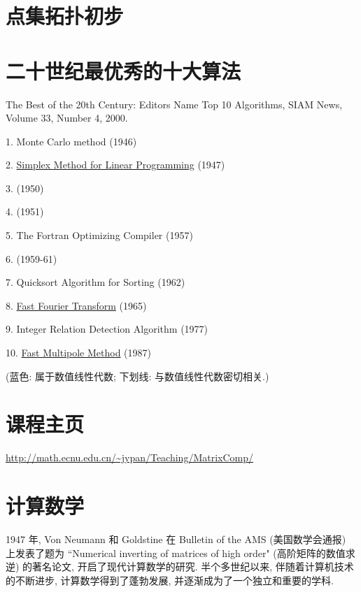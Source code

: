 \section{点集拓扑初步}


\section{二十世纪最优秀的十大算法}

\noindent
The Best of the 20th Century: Editors Name Top 10 Algorithms,
SIAM News, Volume 33, Number 4, 2000.

\begin{blist}\addtolength{\itemsep}{-0.5ex}
	\item[1.] Monte Carlo method (1946)
	\item[2.] \underline{Simplex Method for Linear Programming} (1947)
	\item[3.]  (1950)
	\item[4.]  (1951)
	\item[5.] The Fortran Optimizing Compiler (1957)
	\item[6.]  (1959-61)
	\item[7.] Quicksort Algorithm for Sorting (1962)
	\item[8.] \underline{Fast Fourier Transform} (1965)
	\item[9.] Integer Relation Detection Algorithm (1977)
	\item[10.] \underline{Fast Multipole Method} (1987)
\end{blist}
(蓝色: 属于数值线性代数; 下划线: 与数值线性代数密切相关.)

\section{课程主页}

\url{http://math.ecnu.edu.cn/~jypan/Teaching/MatrixComp/}


\section{计算数学}

1947 年, Von Neumann 和 Goldstine 在 Bulletin of the AMS (美国数学会通报)
上发表了题为 ``Numerical inverting of matrices of high order"
(高阶矩阵的数值求逆) 的著名论文, 开启了现代计算数学的研究.
半个多世纪以来, 伴随着计算机技术的不断进步, 计算数学得到了蓬勃发展,
并逐渐成为了一个独立和重要的学科.

